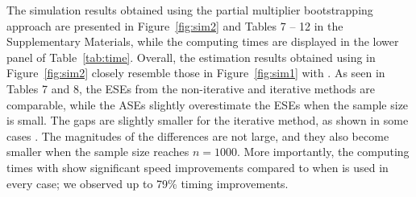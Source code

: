 The simulation results obtained using the partial multiplier bootstrapping approach are presented in Figure~\ref{fig:sim2}
and Tables 7 -- 12 in the Supplementary Materials, 
while the computing times are displayed in the lower panel of Table~\ref{tab:time}. 
Overall, the estimation results obtained using  in Figure~\ref{fig:sim2} 
closely resemble those in Figure~\ref{fig:sim1} with . 
As seen in Tables 7 and 8, the ESEs from the non-iterative and iterative methods are comparable, 
while the ASEs slightly overestimate the ESEs when the sample size is small. 
The gaps are slightly smaller for the iterative method, 
as shown in some cases \citep{johnson2009induced, kim2021comparison}. 
The magnitudes of the differences are not large, and they also become smaller when the sample size reaches $n = 1000$. 
More importantly, the computing times with  show significant speed improvements compared 
to when  is used in every case; we observed up to 79\% timing improvements.

